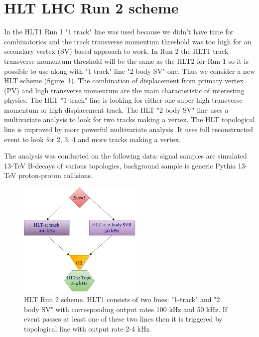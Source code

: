 \documentclass[a4paper]{jpconf}
\begin{document}
\section{HLT LHC Run 2 scheme}
In the HLT1 Run 1 "1 track" line was used because we didn't have time for combinatorics and the track transverse momentum threshold was too high for an secondary vertex (SV) based approach to work. In Run 2 the HLT1 track transverse momentum threshold will be the same as the HLT2 for Run 1 so it is possible to use along with "1 track" line "2 body SV" one. Thus we consider a new HLT scheme (figure~\ref{scheme}). The combination of displacement from primary vertex (PV) and high transverse momentum are the main characteristic of interesting physics. The HLT "1-track" line is looking for either one super high transverse momentum or high displacement track. The HLT "2 body SV" line uses a multivariate analysis to look for two tracks making a vertex. The HLT topological line is improved by more powerful multivariate analysis. It uses full reconstructed event to look for 2, 3, 4 and more tracks making a vertex.

The analysis was conducted on the following data: signal samples are simulated 13-TeV B-decays of various topologies, background sample is generic Pythia 13-TeV proton-proton collisions.

\begin{figure}[h]
\includegraphics[width=14pc]{../images/sheme.png}\hspace{2pc}%
\begin{minipage}[b]{22pc}\caption{\label{scheme} HLT Run 2 scheme. HLT1 consists of two lines: "1-track" and "2 body SV" with corresponding output rates 100 kHz and 50 kHz. If event passes at least one of these two lines then it is triggered by topological line with output rate 2-4 kHz.}
\end{minipage}
\end{figure}
\end{document}
